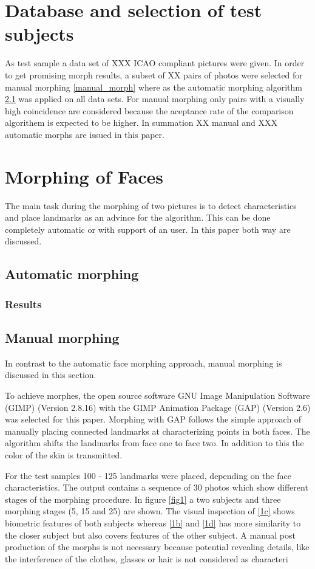 \section{Database and selection of test subjects}
As test sample a data set of XXX ICAO compliant pictures were given. In order to get promising morph results, a subset of XX  pairs of photos were selected for manual morphing \ref{manual_morph} where as the automatic morphing algorithm \ref{automatic_morph} was applied on all data sets. For manual  morphing only pairs with a visually high coincidence are considered because the aceptance rate of the comparison algorithem is expected to be higher. 
In summation XX manual and XXX automatic morphs are issued in this paper. 


\section{Morphing of Faces}
The main task during the morphing of two pictures is to detect characteristics and place landmarks as an advince for the algorithm. This can be done completely automatic or with support of an user. In this paper both way are discussed.  
\subsection{Automatic morphing}
\label{automatic_morph}
\subsubsection{Results}

\subsection*{Manual morphing}
\label{manual_morph}
In contrast to the automatic face morphing approach, manual morphing is discussed in this section. 

To achieve morphes, the open source software GNU Image Manipulation Software (GIMP) (Version 2.8.16) with the GIMP Animation Package (GAP) (Version 2.6) was selected for this paper. Morphing with GAP follows the simple approach of manually placing connected landmarks at characterizing points in both faces. The algorithm shifts the landmarks from face one to face two. In addition to this the color of the skin is transmitted. 

For the test samples 100 - 125 landmarks were placed, depending on the face characteristics. The output contains a sequence of 30 photos which show different stages of the morphing procedure. 
In figure \ref{fig1} a two subjects and three morphing stages (5, 15 and 25) are shown. The visual inspection of \ref{1c} shows biometric features of both subjects whereas \ref{1b} and \ref{1d} has more similarity to the closer subject but also covers features of the other subject.
A manual post production of the morphs is not necessary because potential revealing details, like the interference  of the clothes, glasses or hair is not considered as characteri


